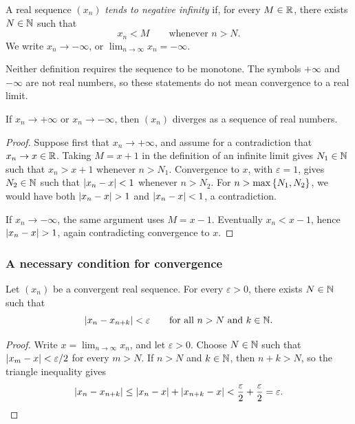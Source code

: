 \documentclass[11pt,a4paper]{amsart}
\begin{document}
\begin{definition}
  A real sequence \((x_n)\) \emph{tends to negative infinity} if, for
  every \(M\in\mathbb{R}\), there exists \(N\in\mathbb{N}\) such that
  \[
    x_n<M\qquad\text{whenever }n>N.
  \]
  We write \(x_n\to-\infty\), or
  \(\lim_{n\to\infty}x_n=-\infty\).
\end{definition}

\begin{remark}
  Neither definition requires the sequence to be monotone. The symbols
  \(+\infty\) and \(-\infty\) are not real numbers, so these statements
  do not mean convergence to a real limit.
\end{remark}

\begin{theorem}
  If \(x_n\to+\infty\) or \(x_n\to-\infty\), then \((x_n)\)
  diverges as a sequence of real numbers.
\end{theorem}

\begin{proof}
  Suppose first that \(x_n\to+\infty\), and assume for a contradiction
  that \(x_n\to x\in\mathbb{R}\). Taking \(M=x+1\) in the definition
  of an infinite limit gives \(N_1\in\mathbb{N}\) such that
  \(x_n>x+1\) whenever \(n>N_1\). Convergence to \(x\), with
  \(\varepsilon=1\), gives \(N_2\in\mathbb{N}\) such that
  \(\lvert x_n-x\rvert<1\) whenever \(n>N_2\). For
  \(n>\max\left\lbrace N_1,N_2\right\rbrace\), we would have both
  \(\lvert x_n-x\rvert>1\) and \(\lvert x_n-x\rvert<1\), a contradiction.

  If \(x_n\to-\infty\), the same argument uses \(M=x-1\).
  Eventually \(x_n<x-1\), hence \(\lvert x_n-x\rvert>1\), again
  contradicting convergence to \(x\).
\end{proof}

\subsubsection{A necessary condition for convergence}

\begin{theorem}\label{thm:convergent-cauchy}
  Let \((x_n)\) be a convergent real sequence. For every
  \(\varepsilon>0\), there exists \(N\in\mathbb{N}\) such that
  \[
    \lvert x_n-x_{n+k}\rvert<\varepsilon
    \qquad\text{for all }n>N\text{ and }k\in\mathbb{N}.
  \]
\end{theorem}

\begin{proof}
  Write \(x=\lim_{n\to\infty}x_n\), and let \(\varepsilon>0\).
  Choose \(N\in\mathbb{N}\) such that \(\lvert x_m-x\rvert<\varepsilon/2\)
  for every \(m>N\). If \(n>N\) and \(k\in\mathbb{N}\), then
  \(n+k>N\), so the triangle inequality gives
  \[
    \lvert x_n-x_{n+k}\rvert
    \leq\lvert x_n-x\rvert+\lvert x_{n+k}-x\rvert
    <\frac{\varepsilon}{2}+\frac{\varepsilon}{2}
    =\varepsilon.
  \]
\end{proof}
\end{document}
